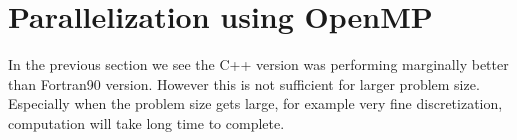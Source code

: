 \section{Parallelization using OpenMP}
In the previous section we see the C++ version was performing marginally better than Fortran90 version. However this is not sufficient for larger problem size. Especially when the problem size gets large, for example very fine discretization, computation will take long time to complete.   